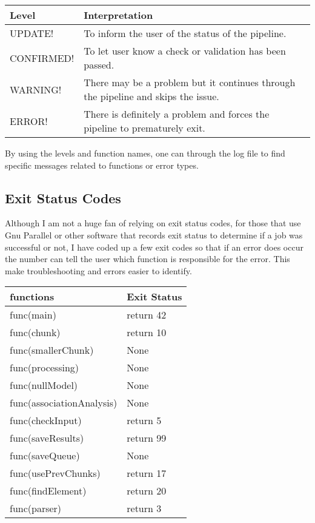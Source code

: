 \documentclass[letterpaper,10pt,english]{sphinxmanual}
\begin{document}
\begin{savenotes}\sphinxattablestart
\centering
\begin{tabulary}{\linewidth}[t]{|T|T|}
\hline
\sphinxstyletheadfamily 
Level
&\sphinxstyletheadfamily 
Interpretation
\\
\hline
UPDATE!
&
To inform the user of the status of the pipeline.
\\
\hline
CONFIRMED!
&
To let user know a check or validation has been passed.
\\
\hline
WARNING!
&
There may be a problem but it continues through the pipeline and skips the issue.
\\
\hline
ERROR!
&
There is definitely a problem and forces the pipeline to prematurely exit.
\\
\hline
\end{tabulary}
\par
\sphinxattableend\end{savenotes}

By using the levels and function names, one can  through the log file to find specific messages related to functions or error types.


\subsection{Exit Status Codes}
\label{\detokenize{parsingStdErrOut:exit-status-codes}}
Although I am not a huge fan of relying on exit status codes, for those that use Gnu Parallel or other software that records exit status to determine if a job was successful or not, I have coded up a few exit codes so that if an error does occur the number can tell the user which function is responsible for the error.  This make troubleshooting and errors easier to identify.


\begin{savenotes}\sphinxattablestart
\centering
\begin{tabulary}{\linewidth}[t]{|T|T|}
\hline
\sphinxstyletheadfamily 
functions
&\sphinxstyletheadfamily 
Exit Status
\\
\hline
func(main)
&
return 42
\\
\hline
func(chunk)
&
return 10
\\
\hline
func(smallerChunk)
&
None
\\
\hline
func(processing)
&
None
\\
\hline
func(nullModel)
&
None
\\
\hline
func(associationAnalysis)
&
None
\\
\hline
func(checkInput)
&
return 5
\\
\hline
func(saveResults)
&
return 99
\\
\hline
func(saveQueue)
&
None
\\
\hline
func(usePrevChunks)
&
return 17
\\
\hline
func(findElement)
&
return 20
\\
\hline
func(parser)
&
return 3
\\
\hline
\end{tabulary}
\par
\sphinxattableend\end{savenotes}
\end{document}
